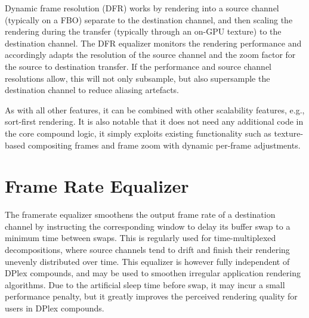 Dynamic frame resolution (DFR) works by rendering into a source channel
(typically on a FBO) separate to the destination channel, and then scaling the
rendering during the transfer (typically through an on-GPU texture) to the
destination channel. The DFR equalizer monitors the rendering performance and
accordingly adapts the resolution of the source channel and the zoom factor for
the source to destination transfer. If the performance and source channel
resolutions allow, this will not only subsample, but also supersample the
destination channel to reduce aliasing artefacts.

As with all other features, it can be combined with other scalability features,
e.g., sort-first rendering. It is also notable that it does not need any
additional code in the core compound logic, it simply exploits existing
functionality such as texture-based compositing frames and frame zoom with
dynamic per-frame adjustments.

\section{Frame Rate Equalizer}\label{sFramerateEq}

The framerate equalizer smoothens the output frame rate of a destination channel
by instructing the corresponding window to delay its buffer swap to a minimum
time between swaps. This is regularly used for time-multiplexed decompositions,
where source channels tend to drift and finish their rendering unevenly
distributed over time. This equalizer is however fully independent of DPlex
compounds, and may be used to smoothen irregular application rendering
algorithms. Due to the artificial sleep time before swap, it may incur a small
performance penalty, but it greatly improves the perceived rendering quality for
users in DPlex compounds.

